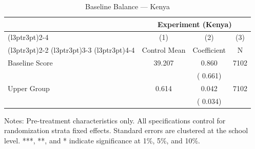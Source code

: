 \begin{table}[H]
\centering
\caption{Baseline Balance --- Kenya}
\label{tab:ke_balance}
\begin{threeparttable}
\begin{tabular}[t]{lccc}
\toprule
\multicolumn{1}{c}{ } & \multicolumn{3}{c}{Experiment (Kenya)} \\
\cmidrule(l{3pt}r{3pt}){2-4}
\multicolumn{1}{c}{ } & \multicolumn{1}{c}{(1)} & \multicolumn{1}{c}{(2)} & \multicolumn{1}{c}{(3)} \\
\cmidrule(l{3pt}r{3pt}){2-2} \cmidrule(l{3pt}r{3pt}){3-3} \cmidrule(l{3pt}r{3pt}){4-4}
 & Control Mean & Coefficient & N \\
\midrule
Baseline Score &  39.207 &   0.860 & 7102 \\
 & & (  0.661) & \\
Upper Group &   0.614 &   0.042 & 7102 \\
 & & (  0.034) & \\
\bottomrule
\end{tabular}
\begin{tablenotes}[para]
\item Notes: Pre-treatment characteristics only. All specifications control for randomization strata fixed effects. Standard errors are clustered at the school level. ***, **, and * indicate significance at 1\%, 5\%, and 10\%.
\end{tablenotes}
\end{threeparttable}
\end{table}
